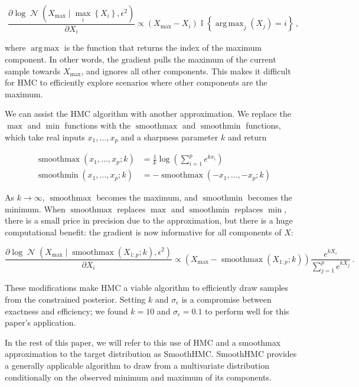 \documentclass[letter]{article}
\newcommand{\genericdel}[3]{%
      \left#1#3\right#2
    }
\newcommand{\del}[1]{\genericdel(){#1}}
\newcommand{\cbr}[1]{\genericdel\{\}{#1}}
\DeclareMathOperator*{\argmax}{arg\,max}
\DeclareMathOperator{\Ind}{\mathbb{I}}
\DeclareMathOperator{\normal}{\mathcal{N}}
\DeclareMathOperator*{\softmax}{smoothmax}
\DeclareMathOperator*{\softmin}{smoothmin}
\newcommand{\Xmax}{X_{\max}}
\begin{document}
\begin{equation}
\frac{\partial \log \normal\del{\Xmax \mid \max_i\cbr{X_i}, \epsilon^2}}{\partial X_i} \propto \del{\Xmax - X_i} \Ind\cbr{\argmax_j\del{X_j} = i} \,,
\end{equation}

where \(\argmax\) is the function that returns the index of the maximum component.
In other words, the gradient pulls the maximum of the current sample towards \(\Xmax\),
and ignores all other components.
This makes it difficult for HMC to efficiently explore scenarios where other components are the maximum.
    


        We can assist the HMC algorithm with another approximation.
We replace the \(\max\) and \(\min\) functions with the \(\softmax\) and \(\softmin\) functions, which take real inputs \(x_1, \ldots, x_p\) and a sharpness parameter \(k\) and return

\begin{equation}
\begin{split}
    \softmax\del{x_1, \ldots, x_p ; k} &= \frac{1}{k} \log\del{\sum_{i=1}^p e^{kx_i}} \\
    \softmin\del{x_1, \ldots, x_p ; k} &= -\softmax\del{-x_1, \ldots, -x_p; k}
\end{split}
\end{equation}

As \(k \rightarrow \infty\), \(\softmax\) becomes the maximum, and \(\softmin\) becomes the minimum. When \(\softmax\) replaces \(\max\) and \(\softmin\) replaces \(\min\), there is a small price in precision due to the approximation, but there is a huge computational benefit: the gradient is now informative for all components of \(X\):

\begin{equation}
\frac{\partial \log \normal\del{\Xmax \mid \softmax\del{X_{1:p} ; k}, \epsilon^2}}{\partial X_i} \propto \del{\Xmax - \softmax\del{X_{1:p} ; k}} 
        \frac{e^{k X_i}}
             {\sum_{j=1}^p e^{k X_j}} \,.
\end{equation}

These modifications make HMC a viable algorithm to efficiently draw samples from the constrained posterior.
Setting \(k\) and \(\sigma_\epsilon\) is a compromise between exactness and efficiency;
we found \(k=10\) and \(\sigma_\epsilon=0.1\) to perform well for this paper's application.

In the rest of this paper, we will refer to this use of HMC and a smoothmax approximation to the target distribution as SmoothHMC.
SmoothHMC provides a generally applicable algorithm to draw from a multivariate distribution conditionally on the observed minimum and maximum of its components.
    
\end{document}
